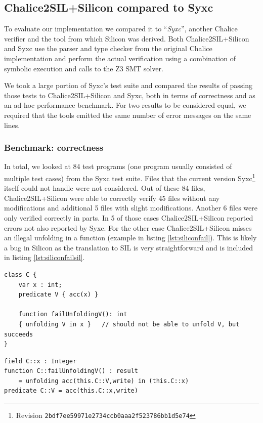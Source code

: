 \subsection{Chalice2SIL+Silicon compared to Syxc}
To evaluate our implementation we compared it to ``\emph{Syxc}'', another Chalice verifier and the tool from which Silicon was derived.
Both Chalice2SIL+Silicon and Syxc use the parser and type checker from the original Chalice implementation and perform the actual verification using a combination of symbolic execution and calls to the Z3 SMT solver.

We took a large portion of Syxc's test suite and compared the results of passing those tests to Chalice2SIL+Silicon and Syxc, both in terms of correctness and as an ad-hoc performance benchmark.
For two results to be considered equal, we required that the tools emitted the same number of error messages on the same lines.

\subsubsection{Benchmark: correctness}
In total, we looked at 84 test programs (one program usually consisted of multiple test cases) from the Syxc test suite. 
Files that the current version Syxc\footnote{Revision \texttt{2bdf7ee59971e2734ccb0aaa2f523786bb1d5e74}} itself could not handle were not considered.
Out of these 84 files, Chalice2SIL+Silicon were able to correctly verify 45 files without any modifications and additional 5 files with slight modifications.
Another 6 files were only verified correctly in parts.
In 5 of those cases Chalice2SIL+Silicon reported errors not also reported by Syxc.
For the other case Chalice2SIL+Silicon misses an illegal unfolding in a function (example in listing \ref{lst:siliconfail}).
This is likely a bug in Silicon as the translation to SIL is very straightforward and is included in listing \ref{lst:siliconfailsil}.

\begin{lstlisting}[language=Chalice,float,caption={Error that is not detected by Chalice2SIL+Silicon.},label={lst:siliconfail}]
class C {
    var x : int;
    predicate V { acc(x) }

	function failUnfoldingV(): int
	{ unfolding V in x }   // should not be able to unfold V, but succeeds
}
\end{lstlisting}

\begin{lstlisting}[language=SIL,float,caption={SIL translation of \ref{lst:siliconfail}},label={lst:siliconfailsil}]
field C::x : Integer
function C::failUnfoldingV() : result 
	= unfolding acc(this.C::V,write) in (this.C::x)
predicate C::V = acc(this.C::x,write)
\end{lstlisting}

